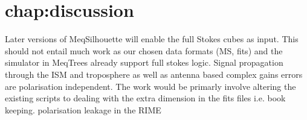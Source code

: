 \chapter{chap:discussion}
Later versions of {\sc MeqSilhouette} will enable the full Stokes cubes as input. This should not entail much work as our chosen data formats (MS, {\sc fits}) and the simulator in {\sc MeqTrees} already support full stokes logic. Signal propagation through the ISM and troposphere as well as antenna based complex gains errors are polarisation independent. The work would be primarly involve altering the existing scripts to dealing with the extra dimension in the {\sc fits} files i.e. book keeping. 
polarisation leakage in the RIME
